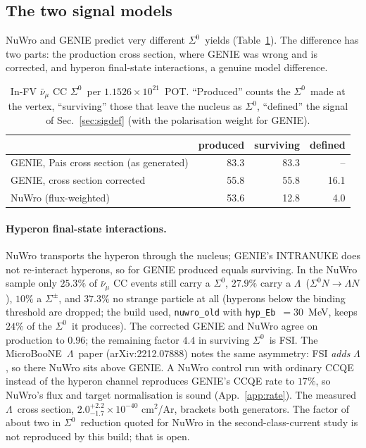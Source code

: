 \documentclass[11pt,a4paper]{article}
\newcommand{\Szero}{\ensuremath{\Sigma^{0}}}
\newcommand{\Lam}{\ensuremath{\Lambda}}
\newcommand{\uboone}{MicroBooNE}
\newcommand{\numubar}{\ensuremath{\bar{\nu}_\mu}}
\begin{document}
\subsection{The two signal models}
\label{sec:models}

NuWro and GENIE predict very different \Szero\ yields (Table~\ref{tab:models}). The
difference has two parts: the production cross section, where GENIE was wrong and is
corrected, and hyperon final-state interactions, a genuine model difference.

\begin{table}[h]\centering
\caption{In-FV $\numubar$ CC \Szero\ per $1.1526\times10^{21}$~POT. ``Produced'' counts
the \Szero\ made at the vertex, ``surviving'' those that leave the nucleus as \Szero,
``defined'' the signal of Sec.~\ref{sec:sigdef} (with the polarisation weight for GENIE).}
\label{tab:models}
\begin{tabular}{lrrr}
\toprule
 & produced & surviving & defined \\
\midrule
GENIE, Pais cross section (as generated)   & 83.3 & 83.3 & -- \\
GENIE, cross section corrected             & 55.8 & 55.8 & 16.1 \\
NuWro (flux-weighted)                      & 53.6 & 12.8 & 4.0 \\
\bottomrule
\end{tabular}
\end{table}

\paragraph{Hyperon final-state interactions.} NuWro transports the hyperon through the
nucleus; GENIE's INTRANUKE does not re-interact hyperons, so for GENIE produced equals
surviving. In the NuWro sample only $25.3\%$ of $\numubar$ CC events still carry a
\Szero, $27.9\%$ carry a \Lam\ ($\Szero N\to\Lam N$), $10\%$ a $\Sigma^\pm$, and $37.3\%$
no strange particle at all (hyperons below the binding threshold are dropped; the
build used, \texttt{nuwro\_old} with \texttt{hyp\_Eb}~$=30$~MeV, keeps $24\%$ of the
\Szero\ it produces). The corrected GENIE and NuWro agree on production to $0.96$; the
remaining factor $4.4$ in surviving \Szero\ is FSI. The \uboone\ \Lam\ paper
(arXiv:2212.07888) notes the same asymmetry: FSI \emph{adds} \Lam, so there NuWro sits
above GENIE. A NuWro control run with ordinary CCQE instead of the hyperon channel
reproduces GENIE's CCQE rate to $17\%$, so NuWro's flux and target normalisation is sound
(App.~\ref{app:rate}). The measured \Lam\ cross section, $2.0^{+2.2}_{-1.7}\times10^{-40}$
cm$^2$/Ar, brackets both generators. The factor of about two in \Szero\ reduction quoted
for NuWro in the second-class-current study is not reproduced by this build; that is
open.
\end{document}
